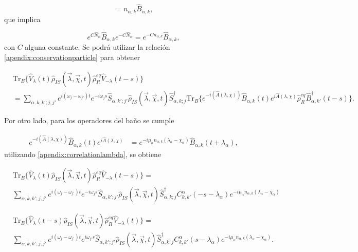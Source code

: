 \begin{appendixs}
\begin{equation*}
    [\hat{B}_{\alpha,k},\hat{N}_{\alpha}] = n_{\alpha,k}\hat{B}_{\alpha,k},
\end{equation*}
que implica 

\begin{equation}
    e^{C\hat{N}_{\alpha}}\hat{B}_{\alpha,k}e^{-C\hat{N}_{\alpha}} = e^{-Cn_{\alpha,k}}\hat{B}_{\alpha,k}, 
    \label{apendix:conservationparticle}
\end{equation}
con $C$ alguna constante. Se podrá utilizar la relación \ref{apendix:conservationparticle} para obtener

\begin{align*}
   & \text{Tr}_{B}\{ \hat{V}_{\lambda}(t)\hat{\rho}_{IS}(\vec{\lambda},\vec{\chi},t)\hat{\rho}_{R}^{eq}\hat{V}_{-\lambda}(t-s) \} \\
   & = \sum_{\alpha,k,k';j,j'}e^{i(\omega_{j}-\omega_{j'})t}e^{-i\omega_{j}s}\hat{S}_{\alpha,k';j'}\hat{\rho}_{IS}(\vec{\lambda},\vec{\chi},t)\hat{S}^{\dagger}_{\alpha,k;j} \text{Tr}_{B}\{e^{-i(\hat{A}(\lambda,\chi))} \hat{B}_{\alpha,k}(t)e^{i\hat{A}(\lambda,\chi)}\hat{\rho}_{R}^{eq}\hat{B}^{\dagger}_{\alpha,k'}(t-s) \}.
\end{align*}

Por otro lado, para los operadores del baño se cumple

\begin{align}
    e^{-i(\hat{A}(\lambda,\chi))} \hat{B}_{\alpha,k}(t)e^{i\hat{A}(\lambda,\chi)} & = e^{-i\mu_{\alpha}n_{\alpha,k}(\lambda_{\alpha}-\chi_{\alpha})} \hat{B}_{\alpha,k}(t+\lambda_{\alpha}), 
    \label{apendix:correlationlambda}
\end{align}
utilizando \ref{apendix:correlationlambda}, se obtiene

\begin{align*}
 & \text{Tr}_{B}\{ \hat{V}_{\lambda}(t)\hat{\rho}_{IS}(\vec{\lambda},\vec{\chi},t)\hat{\rho}_{R}^{eq}\hat{V}_{-\lambda}(t-s) \} = \\
 & \sum_{\alpha,k,k';j,j'}e^{i(\omega_{j}-\omega_{j'})t}e^{-i\omega_{j}s}\hat{S}_{\alpha,k';j'}\hat{\rho}_{IS}(\vec{\lambda},\vec{\chi},t)\hat{S}^{\dagger}_{\alpha,k;j} C^{\alpha}_{k,k'}(-s-\lambda_{\alpha})e^{-i\mu_{\alpha}n_{\alpha,k}(\lambda_{\alpha}-\chi_{\alpha})}
 \end{align*}

 \begin{align*}
    & \text{Tr}_{B}\{ \hat{V}_{\lambda}(t-s)\hat{\rho}_{IS}(\vec{\lambda},\vec{\chi},t)\hat{\rho}_{R}^{eq}\hat{V}_{-\lambda}(t) \} = \\
    & \sum_{\alpha,k,k';j,j'}e^{i(\omega_{j}-\omega_{j'})t}e^{i\omega_{j'}s}\hat{S}_{\alpha,k';j'}\hat{\rho}_{IS}(\vec{\lambda},\vec{\chi},t)\hat{S}^{\dagger}_{\alpha,k;j} C^{\alpha}_{k,k'}(s-\lambda_{\alpha})e^{-i\mu_{\alpha}n_{\alpha,k}(\lambda_{\alpha}-\chi_{\alpha})}.
    \end{align*}
   

\end{appendixs}
